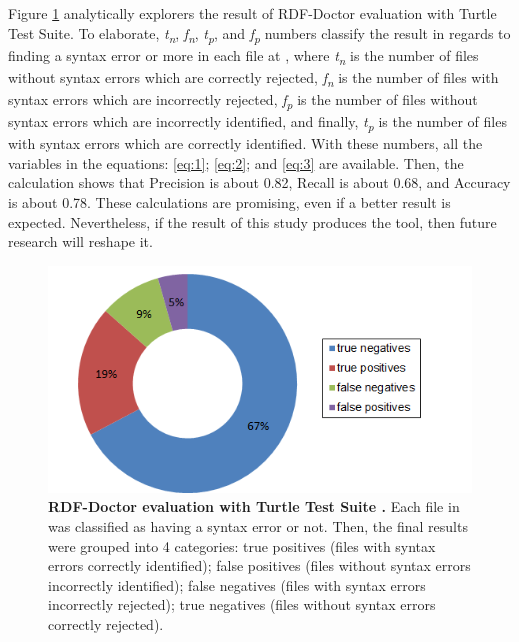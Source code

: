 Figure \ref{Fig:Experiment01} analytically explorers the result of RDF-Doctor evaluation  with Turtle Test Suite. To elaborate, \textit{t\textsubscript{n}}, 
\textit{f\textsubscript{n}}, 
\textit{t\textsubscript{p}}, 
and \textit{f\textsubscript{p}} numbers classify the result in regards to finding a syntax error  or more in each file at \cite{TurtleTests:Online}, where \textit{t\textsubscript{n}} is the number of files without syntax errors which are correctly rejected, \textit{f\textsubscript{n}} is  the number of files  with  syntax  errors  which are  incorrectly  rejected, \textit{f\textsubscript{p}} is the number of
 files without syntax errors  which are incorrectly identified, and finally, \textit{t\textsubscript{p}} is the number of files with syntax errors  which are correctly identified. With these numbers, all the variables in the equations: \ref{eq:1};  \ref{eq:2}; and \ref{eq:3} are available. Then, the calculation shows that Precision is about 0.82,  Recall is about 0.68, and Accuracy is about 0.78. These calculations are promising, even if a better result is expected. Nevertheless, if the result of this study produces the tool, then future research will reshape it.    
 
 
\begin{figure}
\begin{center}
		\includegraphics[scale=.8,angle=0]{images/Experiment01.png}
		\vspace*{-1mm}
		\caption{\textbf{RDF-Doctor evaluation with Turtle Test Suite \cite{TurtleTests:Online}.} Each file in \cite{TurtleTests:Online} was classified as having a syntax error or not. Then, the final results were grouped into 4 categories: true positives (files with syntax errors  correctly identified); false positives (files without syntax errors  incorrectly identified); false negatives (files with syntax errors  incorrectly rejected); true negatives (files without syntax errors  correctly rejected).}
		\label{Fig:Experiment01}
\end{center}
\end{figure}

